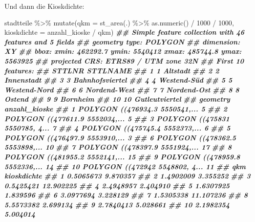 \documentclass[11pt,german,a4paper]{article}
\newenvironment{Shaded}{\begin{snugshade}}{\end{snugshade}}
\newcommand{\AttributeTok}[1]{\textcolor[rgb]{0.77,0.63,0.00}{#1}}
\newcommand{\DecValTok}[1]{\textcolor[rgb]{0.00,0.00,0.81}{#1}}
\newcommand{\DocumentationTok}[1]{\textcolor[rgb]{0.56,0.35,0.01}{\textbf{\textit{#1}}}}
\newcommand{\FunctionTok}[1]{\textcolor[rgb]{0.00,0.00,0.00}{#1}}
\newcommand{\NormalTok}[1]{#1}
\newcommand{\SpecialCharTok}[1]{\textcolor[rgb]{0.00,0.00,0.00}{#1}}
\begin{document}
Und dann die Kioskdichte:

\begin{Shaded}
\begin{Highlighting}[]
\NormalTok{stadtteile }\SpecialCharTok{\%\textgreater{}\%}
  \FunctionTok{mutate}\NormalTok{(}\AttributeTok{qkm =} \FunctionTok{st\_area}\NormalTok{(.) }\SpecialCharTok{\%\textgreater{}\%} \FunctionTok{as.numeric}\NormalTok{() }\SpecialCharTok{/} \DecValTok{1000} \SpecialCharTok{/} \DecValTok{1000}\NormalTok{,}
         \AttributeTok{kioskdichte =}\NormalTok{ anzahl\_kioske }\SpecialCharTok{/}\NormalTok{ qkm)}
\DocumentationTok{\#\# Simple feature collection with 46 features and 5 fields}
\DocumentationTok{\#\# geometry type:  POLYGON}
\DocumentationTok{\#\# dimension:      XY}
\DocumentationTok{\#\# bbox:           xmin: 462292.7 ymin: 5540412 xmax: 485744.8 ymax: 5563925}
\DocumentationTok{\#\# projected CRS:  ETRS89 / UTM zone 32N}
\DocumentationTok{\#\# First 10 features:}
\DocumentationTok{\#\#    STTLNR        STTLNAME}
\DocumentationTok{\#\# 1       1        Altstadt}
\DocumentationTok{\#\# 2       2      Innenstadt}
\DocumentationTok{\#\# 3       3 Bahnhofsviertel}
\DocumentationTok{\#\# 4       4     Westend{-}Süd}
\DocumentationTok{\#\# 5       5    Westend{-}Nord}
\DocumentationTok{\#\# 6       6    Nordend{-}West}
\DocumentationTok{\#\# 7       7     Nordend{-}Ost}
\DocumentationTok{\#\# 8       8          Ostend}
\DocumentationTok{\#\# 9       9        Bornheim}
\DocumentationTok{\#\# 10     10  Gutleutviertel}
\DocumentationTok{\#\#                          geometry anzahl\_kioske}
\DocumentationTok{\#\# 1  POLYGON ((476934.3 5550541,...             5}
\DocumentationTok{\#\# 2  POLYGON ((477611.9 5552034,...             5}
\DocumentationTok{\#\# 3  POLYGON ((475831 5550785, 4...             7}
\DocumentationTok{\#\# 4  POLYGON ((475745.4 5552373,...             6}
\DocumentationTok{\#\# 5  POLYGON ((476497.9 5553910,...             3}
\DocumentationTok{\#\# 6  POLYGON ((478362.5 5553898,...            10}
\DocumentationTok{\#\# 7  POLYGON ((478397.9 5551924,...            17}
\DocumentationTok{\#\# 8  POLYGON ((481955.2 5552141,...            15}
\DocumentationTok{\#\# 9  POLYGON ((478959.8 5552336,...            14}
\DocumentationTok{\#\# 10 POLYGON ((472942 5548802, 4...            11}
\DocumentationTok{\#\#          qkm kioskdichte}
\DocumentationTok{\#\# 1  0.5065673    9.870357}
\DocumentationTok{\#\# 2  1.4902009    3.355252}
\DocumentationTok{\#\# 3  0.5425421   12.902225}
\DocumentationTok{\#\# 4  2.4948957    2.404910}
\DocumentationTok{\#\# 5  1.6307925    1.839596}
\DocumentationTok{\#\# 6  3.0977694    3.228129}
\DocumentationTok{\#\# 7  1.5305338   11.107236}
\DocumentationTok{\#\# 8  5.5573382    2.699134}
\DocumentationTok{\#\# 9  2.7840413    5.028661}
\DocumentationTok{\#\# 10 2.1982354    5.004014}
\end{Highlighting}
\end{Shaded}
\end{document}
